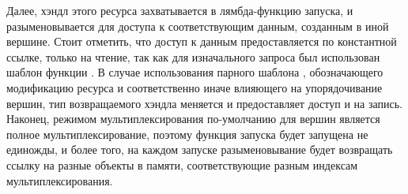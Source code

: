 Далее, хэндл этого ресурса захватывается в лямбда-функцию запуска, и разыменовывается для доступа к соответствующим данным, созданным в иной вершине.
Стоит отметить, что доступ к данным предоставляется по константной ссылке, только на чтение, так как для изначального запроса был использован шаблон функции .
В случае использования парного шаблона , обозначающего модификацию ресурса и соответственно иначе влияющего на упорядочивание вершин, тип возвращаемого хэндла меняется и предоставляет доступ и на запись.
Наконец, режимом мультиплексирования по-умолчанию для вершин является полное мультиплексирование, поэтому функция запуска будет запущена не единожды, и более того, на каждом запуске разыменовывание  будет возвращать ссылку на разные объекты в памяти, соответствующие разным индексам мультиплексирования.

